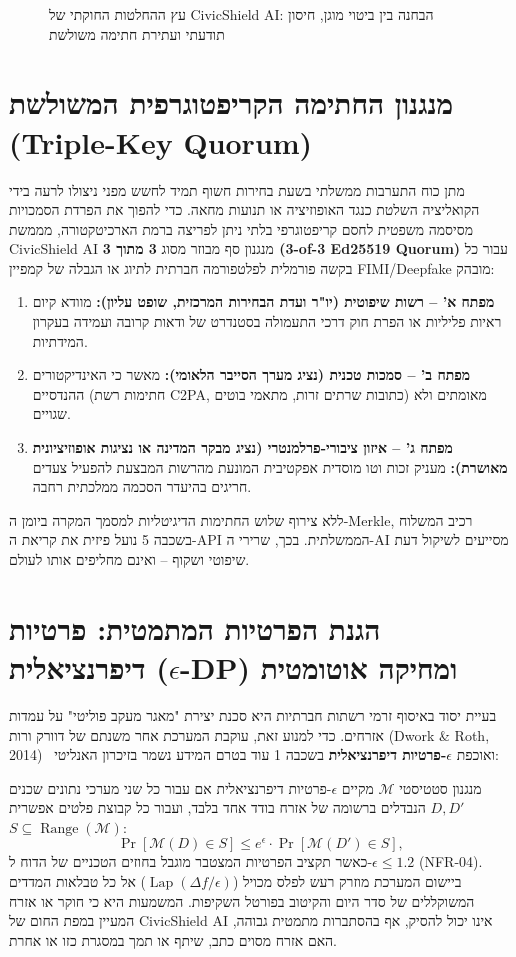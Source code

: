 \begin{figure}[htbp]
    \centering
    
    \caption{עץ ההחלטות החוקתי של CivicShield AI: הבחנה בין ביטוי מוגן, חיסון תודעתי ועתירת חתימה משולשת}
    \label{fig:constitutional_tree}
\end{figure}

\section{מנגנון החתימה הקריפטוגרפית המשולשת (Triple-Key Quorum)}
מתן כוח התערבות ממשלתי בשעת בחירות חשוף תמיד לחשש מפני ניצולו לרעה בידי הקואליציה השלטת כנגד האופוזיציה או תנועות מחאה. כדי להפוך את הפרדת הסמכויות מסיסמה משפטית לחסם קריפטוגרפי בלתי ניתן לפריצה ברמת הארכיטקטורה, מממשת CivicShield AI מנגנון סף מבוזר מסוג \textbf{3 מתוך 3 (3-of-3 Ed25519 Quorum)} עבור כל בקשה פורמלית לפלטפורמה חברתית לתיוג או הגבלה של קמפיין FIMI/Deepfake מובהק:
\begin{enumerate}
    \item \textbf{מפתח א' -- רשות שיפוטית (יו"ר ועדת הבחירות המרכזית, שופט עליון):} מוודא קיום ראיות פליליות או הפרת חוק דרכי התעמולה בסטנדרט של ודאות קרובה ועמידה בעקרון המידתיות.
    \item \textbf{מפתח ב' -- סמכות טכנית (נציג מערך הסייבר הלאומי):} מאשר כי האינדיקטורים ההנדסיים (חתימות רשת C2PA, כתובות שרתים זרות, מתאמי בוטים) מאומתים ולא שגויים.
    \item \textbf{מפתח ג' -- איזון ציבורי-פרלמנטרי (נציג מבקר המדינה או נציגות אופוזיציונית מאושרת):} מעניק זכות וטו מוסדית אפקטיבית המונעת מהרשות המבצעת להפעיל צעדים חריגים בהיעדר הסכמה ממלכתית רחבה.
\end{enumerate}
ללא צירוף שלוש החתימות הדיגיטליות למסמך המקרה ביומן ה-Merkle, רכיב המשלוח בשכבה 5 נועל פיזית את קריאת ה-API הממשלתית. בכך, שרירי ה-AI מסייעים לשיקול דעת שיפוטי ושקוף -- ואינם מחליפים אותו לעולם.

\section{הגנת הפרטיות המתמטית: פרטיות דיפרנציאלית ($\epsilon$-DP) ומחיקה אוטומטית}
בעיית יסוד באיסוף זרמי רשתות חברתיות היא סכנת יצירת "מאגר מעקב פוליטי" על עמדות אזרחים. כדי למנוע זאת, עוקבת המערכת אחר משנתם של דוורק ורות (Dwork \& Roth, 2014)~\cite{dwork2014dp} ואוכפת \textbf{$\epsilon$-פרטיות דיפרנציאלית} בשכבה 1 עוד בטרם המידע נשמר בזיכרון האנליטי:

מנגנון סטטיסטי $\mathcal{M}$ מקיים $\epsilon$-פרטיות דיפרנציאלית אם עבור כל שני מערכי נתונים שכנים $D, D'$ הנבדלים ברשומה של אזרח בודד אחד בלבד, ועבור כל קבוצת פלטים אפשרית $S \subseteq \operatorname{Range}(\mathcal{M})$:
\begin{equation}
\Pr[\mathcal{M}(D) \in S] \le e^{\epsilon} \cdot \Pr[\mathcal{M}(D') \in S],
\label{eq:dp}
\end{equation}
כאשר תקציב הפרטיות המצטבר מוגבל בחוזים הטכניים של הדוח ל-$\epsilon \le 1.2$ (NFR-04). ביישום המערכת מוזרק רעש לפלס מכויל ($\operatorname{Lap}(\Delta f / \epsilon)$) אל כל טבלאות המדדים המשוקללים של סדר היום והקיטוב בפורטל השקיפות. המשמעות היא כי חוקר או אזרח המעיין במפת החום של CivicShield AI אינו יכול להסיק, אף בהסתברות מתמטית גבוהה, האם אזרח מסוים כתב, שיתף או תמך במסגרת כזו או אחרת.

